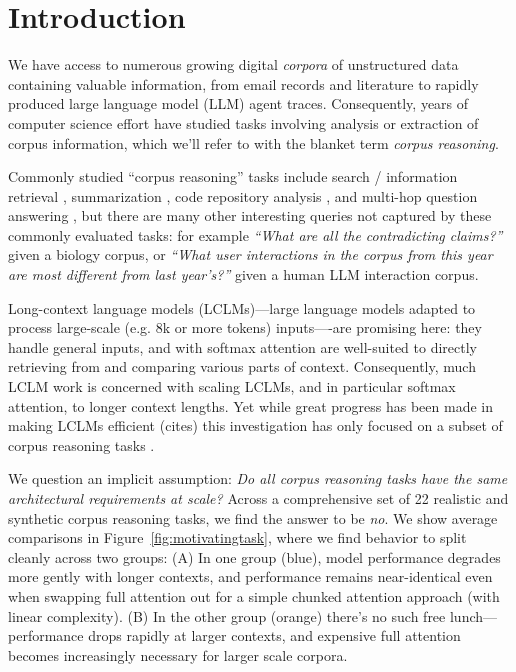 \section{Introduction}


We have access to numerous growing digital \emph{corpora} of unstructured data containing valuable information, from email records and literature to rapidly produced large language model (LLM) agent traces. Consequently, years of computer science effort have studied tasks involving analysis or extraction of corpus information, which we'll refer to with the blanket term \emph{corpus reasoning}. 

Commonly studied ``corpus reasoning'' tasks include search / information retrieval \citep{TREC2021, Hou2025CLERCAD}, summarization \citep{Kocisk2017TheNR}, code repository analysis \citep{Bai2024LongBenchVT}, and multi-hop question answering \citep{Yang2018HotpotQAAD}, but there are many other interesting queries not captured by these commonly evaluated tasks: for example \emph{``What are all the contradicting claims?''} given a biology corpus, or \emph{``What user interactions in the corpus from this year are most different from last year's?''} given a human LLM interaction corpus. 

Long-context language models (LCLMs)---large language models adapted to process large-scale (e.g. 8k or more tokens) inputs----are promising here: they handle general inputs, and with softmax attention are well-suited to directly retrieving from and comparing various parts of context. Consequently, much LCLM work is concerned with scaling LCLMs, and in particular softmax attention, to longer context lengths. Yet while great progress has been made in making LCLMs efficient (cites) this investigation has only focused on a subset of corpus reasoning tasks \cite{Yen2024HELMETHT, Bai2024LongBenchVT, Chen2026LongBenchPA}.%

We question an implicit assumption: \emph{Do all corpus reasoning tasks have the same architectural requirements at scale?} Across a comprehensive set of 22 realistic and synthetic corpus reasoning tasks, we find the answer to be \emph{no}. We show average comparisons in Figure~\ref{fig:motivatingtask}, where we find behavior to split cleanly across two groups: (A) In one group (blue), model performance degrades more gently with longer contexts, and performance remains near-identical even when swapping full attention out for a simple chunked attention approach (with linear complexity). (B) In the other group (orange) there's no such free lunch---performance drops rapidly at larger contexts, and expensive full attention becomes increasingly necessary for larger scale corpora. 

